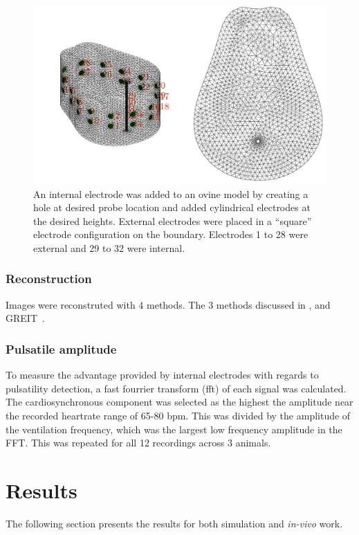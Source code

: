 \begin{figure}
    \centering
	\includegraphics[width=\textwidth]{chapter7-internal_elec_motion/imgs/lamb_model.pdf} 
	\caption[Ovine model with internal probe]{\label{fig:internal_lamb_model} 
	An internal electrode was added to an ovine model by creating a hole at desired probe
	location and added cylindrical electrodes at the desired heights. External electrodes
	were placed in a ``square'' electrode configuration on the boundary. Electrodes 1 to 28 were 
	external and 29 to 32 were internal.}
\end{figure}

\subsubsection{Reconstruction}
Images were reconstruted with 4 methods. The 3 methods discussed in , 
and GREIT~\parencite{grychtol_3d_2016}.

\subsubsection{Pulsatile amplitude}
To measure the advantage provided by internal electrodes with regards to pulsatility detection, 
a fast fourrier transform (\acrshort{fft}) of each signal was calculated. 
The cardiosynchronous component was selected as the highest 
the amplitude near the recorded heartrate range of 65-80 bpm.
This was divided by the amplitude of the ventilation frequency, which was the largest
low frequency amplitude in the FFT. 
This was repeated for all 12 recordings across 3 animals.

\section{Results}
The following section presents the results for both simulation and 
\emph{in-vivo} work.


